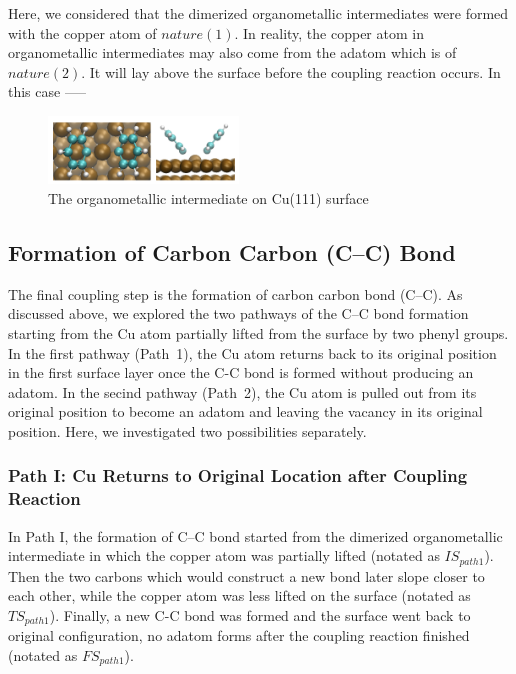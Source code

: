 \documentclass[%
 reprint,
 amsmath,amssymb,
 aps,
prb,
]{revtex4-2}
\begin{document}
Here, we considered that the dimerized organometallic intermediates were formed with the copper atom of $nature(1)$. In reality, the copper atom in organometallic intermediates may also come from the adatom which is of $nature(2)$. It will lay above the surface before the coupling reaction occurs. In this case -----

\begin{figure}[hbt]
\centering
\includegraphics[width=0.45\textwidth]{Fig/organometallicintermediate.png}
\caption{The organometallic intermediate on Cu(111) surface}
\label{fig:organometallicintermediate}
\end{figure}

\subsection{Formation of Carbon Carbon (C--C) Bond}

The final coupling step is the formation of carbon carbon bond (C--C). As discussed above, we explored the two pathways of the C--C bond formation starting from  the Cu atom partially lifted from the surface by two phenyl groups. In the first pathway (Path~1), the Cu atom returns back to its original position in the first surface layer once the C-C bond is formed without producing an adatom. In the secind pathway (Path~2), the Cu atom is pulled out from its original position to become an adatom and leaving the vacancy in its original position. %
Here, we investigated two possibilities separately.

\subsubsection{Path I: Cu Returns to Original Location after Coupling Reaction}

In Path I, the formation of C--C bond started from the dimerized organometallic intermediate in which the copper atom was partially lifted (notated as $IS_{path1}$). Then the two carbons which would construct a new bond later slope closer to each other, while the copper atom was less lifted on the surface (notated as $TS_{path1}$). Finally, a new C-C bond was formed and the surface went back to original configuration, no adatom forms after the coupling reaction finished (notated as $FS_{path1}$).
\end{document}
